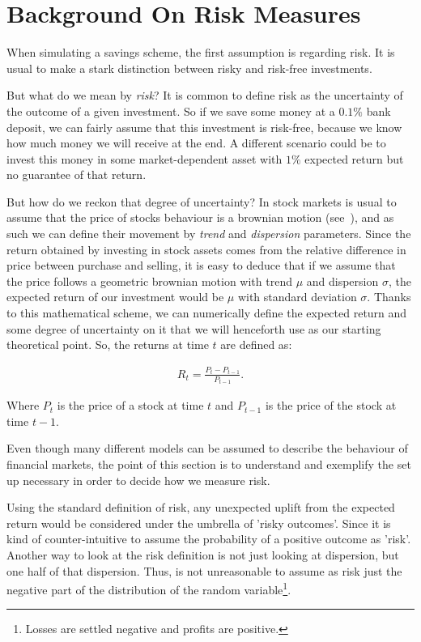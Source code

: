 \section{Background On Risk Measures} \label{sec:risk}

When simulating a savings scheme, the first assumption is regarding risk. It is usual to make a stark distinction between risky and risk-free investments.

But what do we mean by \textit{risk}? It is common to define risk as the uncertainty of the outcome of a given investment. So if we save some money at a $0.1 \%$ bank deposit, we can fairly assume that this investment is risk-free, because we know how much money we will receive at the end. A different scenario could be to invest this money in some market-dependent asset with $1 \%$ expected return but no guarantee of that return.

But how do we reckon that degree of uncertainty? In stock markets is usual to assume that the price of stocks behaviour is a brownian motion (see~\cite{b:cootner-random, a:samuelson-speculative}), and as such we can define their movement by \textit{trend} and \textit{dispersion} parameters. Since the return obtained by investing in stock assets comes from the relative difference in price between purchase and selling, it is easy to deduce that if we assume that the price follows a geometric brownian motion with trend $\mu$ and dispersion $\sigma$, the expected return of our investment would be $\mu$ with standard deviation $\sigma$. Thanks to this mathematical scheme, we can numerically define the expected return and some degree of uncertainty on it that we will henceforth use as our starting theoretical point. So, the returns at time $t$ are defined as:

\begin{align} \label{eq:return}
    R_t = \frac{P_t - P_{t-1}}{P_{t-1}}\textit{.}
\end{align}

Where $P_t$ is the price of a stock at time $t$ and $P_{t-1}$ is the price of the stock at time $t-1$.

Even though many different models can be assumed to describe the behaviour of financial markets, the point of this section is to understand and exemplify the set up necessary in order to decide how we measure risk.

Using the standard definition of risk, any unexpected uplift from the expected return would be considered under the umbrella of 'risky outcomes'. Since it is kind of counter-intuitive to assume the probability of a positive outcome as 'risk'. Another way to look at the risk definition is not just looking at dispersion, but one half of that dispersion. Thus, is not unreasonable to assume as risk just the negative part of the distribution of the random variable\footnote{Losses are settled negative and profits are positive.}.

